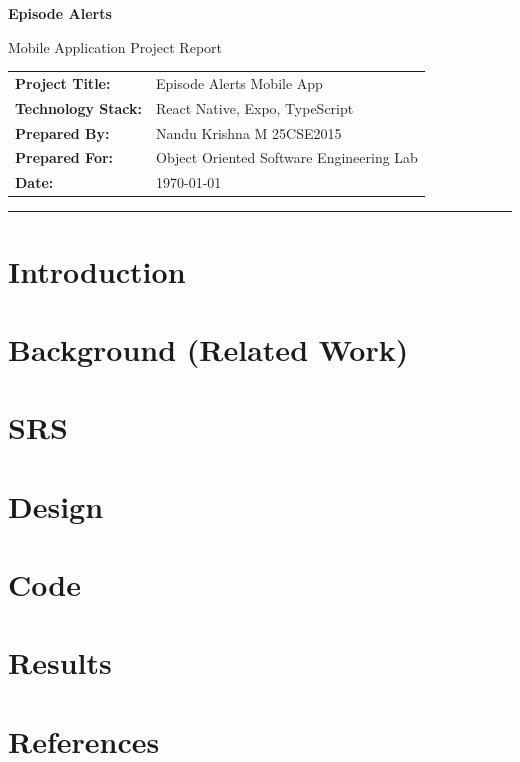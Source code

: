 \documentclass[12pt,a4paper]{report}
\begin{document}
\hypersetup{pageanchor=false}

\begin{titlepage}
  \centering
  \vspace*{1.5cm}

  {\Huge\bfseries Episode Alerts\par}
  \vspace{0.35cm}
  {\Large Mobile Application Project Report\par}

  \vspace{1.75cm}
  \begin{tabularx}{0.85\textwidth}{>{\bfseries}lX}
    Project Title: & Episode Alerts Mobile App \\
    Technology Stack: & React Native, Expo, TypeScript \\
    Prepared By: & Nandu Krishna M 25CSE2015 \\
    Prepared For: & Object Oriented Software Engineering Lab \\
    Date: & \today \\
  \end{tabularx}

  \vfill
  {\color{ReportLight}\rule{0.8\textwidth}{1pt}\par}
  \vspace{0.5cm}
\end{titlepage}
\hypersetup{pageanchor=true}
\tableofcontents
\clearpage
{}

\chapter{Introduction}


\chapter{Background (Related Work)}


\chapter{SRS}


\chapter{Design}


\chapter{Code}


\chapter{Results}


\chapter*{References}

\end{document}
